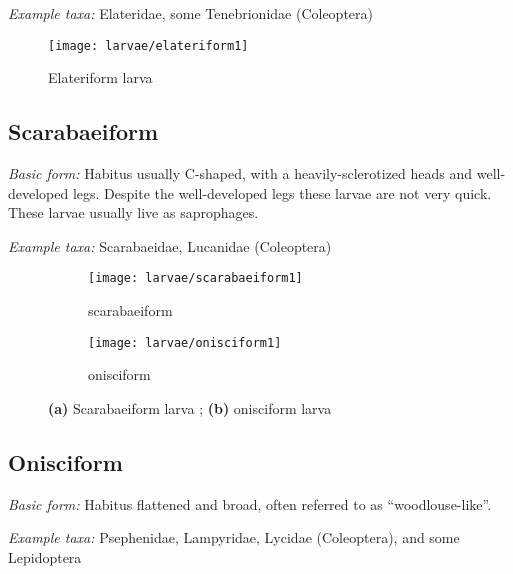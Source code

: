 \noindent{}\textit{Example taxa:} Elateridae, some Tenebrionidae (Coleoptera)\vspace{3mm}

\begin{figure}[ht!]
  \centering
    \texttt{[image: larvae/elateriform1]}
  \caption{Elateriform larva \citep[modified from][Plate X]{bhlitem36654Larvae}}
  \label{fig:elateriform1}
\end{figure}

\subsection{Scarabaeiform}%
\noindent{}\textit{Basic form:} Habitus usually C-shaped, with a heavily-sclerotized heads and well-developed legs. Despite the well-developed legs these larvae are not very quick. These larvae usually live as saprophages.\vspace{3mm}

\noindent{}\textit{Example taxa:} Scarabaeidae, Lucanidae (Coleoptera)\vspace{3mm}

\begin{figure}[ht!]
    \centering
    \begin{subfigure}[ht!]{0.38\textwidth}
      \centering
        \texttt{[image: larvae/scarabaeiform1]}
        \caption{scarabaeiform}
        \label{fig:scarabaeiform1}
    \end{subfigure}
    \hfill
    \begin{subfigure}[ht!]{0.48\textwidth}
        \texttt{[image: larvae/onisciform1]}
        \caption{onisciform}
        \label{fig:onisciform1}
    \end{subfigure}
    \caption{\textbf{(a)} Scarabaeiform larva \citep[redrawn from][Fig. 1A]{bhlitem130205scarab}; \textbf{(b)} onisciform larva \citep[modified from][Plate IX]{bhlitem36654Larvae}}\label{fig:larvae123}
\end{figure}

\subsection{Onisciform} 
\noindent{}\textit{Basic form:} Habitus flattened and broad, often referred to as ``woodlouse-like''.\vspace{3mm}

\noindent{}\textit{Example taxa:} Psephenidae, Lampyridae, Lycidae (Coleoptera), and some Lepidoptera\vspace{3mm}

